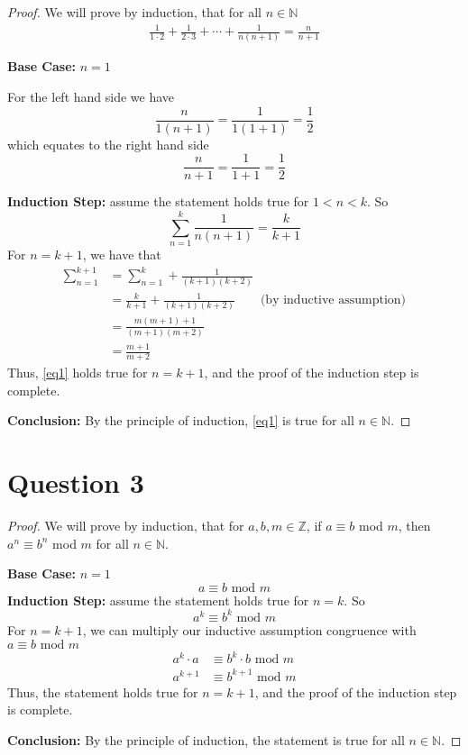 \documentclass[11pt, oneside]{article}   	%
\begin{document}
\begin{proof} We will prove by induction, that for all $n \in \mathbb{N}$
\begin{align}
\frac{1}{1\cdot2} + \frac{1}{2\cdot3} + \cdots + \frac{1}{n(n+1)} = \frac{n}{n+1}
\label{eq1}
\end{align}

\textbf{Base Case:} $n=1$

For the left hand side we have
$$\frac{n}{1(n+1)} = \frac{1}{1(1+1)} = \frac{1}{2}$$
which equates to the right hand side
$$\frac{n}{n+1} = \frac{1}{1+1} = \frac{1}{2}$$

\textbf{Induction Step:} assume the statement holds true for $1 < n < k$. So
$$\sum_{n=1}^k \frac{1}{n(n+1)} = \frac{k}{k+1}$$
For $n = k+1$, we have that
\begin{align*}
	\sum_{n=1}^{k+1} & = \sum_{n=1}^k + \frac{1}{(k+1)(k+2)} \\
	 & = \frac{k}{k+1} + \frac{1}{(k+1)(k+2)} \qquad \text{(by inductive assumption)} \\
	& = \frac{m(m+1)+1}{(m+1)(m+2)} \\
	& = \frac{m+1}{m+2}
\end{align*}
Thus, \eqref{eq1} holds true for $n=k+1$, and the proof of the induction step is complete.

\textbf{Conclusion:} By the principle of induction, \eqref{eq1} is true for all $n \in \mathbb{N}$.
\end{proof}


\section*{Question 3}

\begin{proof} We will prove by induction, that for $a,b,m \in \mathbb{Z}$, if $a \equiv b$ mod $m$, then $a^n \equiv b^n$ mod $m$ for all $n \in \mathbb{N}$.

\textbf{Base Case:} $n=1$
$$a\equiv b \text{ mod } m $$
\textbf{Induction Step:} assume the statement holds true for $n=k$. So
$$a^k \equiv b^k \text{ mod } m$$
For $n = k+1$, we can multiply our inductive assumption congruence with $a \equiv b \text{ mod } m$
\begin{align*}
	a^k \cdot a & \equiv b^k \cdot b \text{ mod } m \\
	a^{k+1} & \equiv b^{k+1} \text{ mod } m 
\end{align*}
Thus, the statement holds true for $n=k+1$, and the proof of the induction step is complete.

\textbf{Conclusion:} By the principle of induction, the statement is true for all $n \in \mathbb{N}$.
\end{proof}
\end{document}

